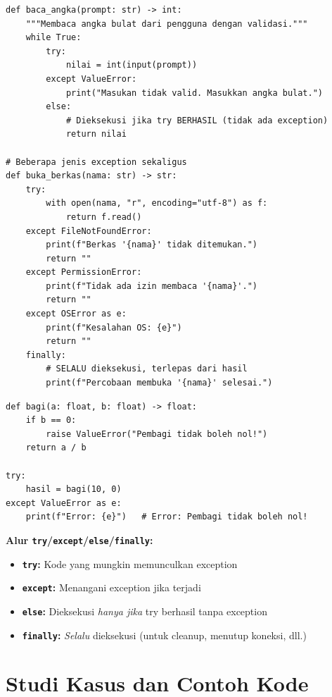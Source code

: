 \documentclass[../main.tex]{subfiles}
\begin{document}
\begin{lstlisting}[caption=Pola try/except/else/finally lengkap]
def baca_angka(prompt: str) -> int:
    """Membaca angka bulat dari pengguna dengan validasi."""
    while True:
        try:
            nilai = int(input(prompt))
        except ValueError:
            print("Masukan tidak valid. Masukkan angka bulat.")
        else:
            # Dieksekusi jika try BERHASIL (tidak ada exception)
            return nilai

# Beberapa jenis exception sekaligus
def buka_berkas(nama: str) -> str:
    try:
        with open(nama, "r", encoding="utf-8") as f:
            return f.read()
    except FileNotFoundError:
        print(f"Berkas '{nama}' tidak ditemukan.")
        return ""
    except PermissionError:
        print(f"Tidak ada izin membaca '{nama}'.")
        return ""
    except OSError as e:
        print(f"Kesalahan OS: {e}")
        return ""
    finally:
        # SELALU dieksekusi, terlepas dari hasil
        print(f"Percobaan membuka '{nama}' selesai.")
\end{lstlisting}

\begin{lstlisting}[caption=Raise exception dan exception kustom]
def bagi(a: float, b: float) -> float:
    if b == 0:
        raise ValueError("Pembagi tidak boleh nol!")
    return a / b

try:
    hasil = bagi(10, 0)
except ValueError as e:
    print(f"Error: {e}")   # Error: Pembagi tidak boleh nol!
\end{lstlisting}

\begin{konsep}
\textbf{Alur \texttt{try}/\texttt{except}/\texttt{else}/\texttt{finally}:}
\begin{itemize}[leftmargin=*]
  \item \textbf{\texttt{try}:} Kode yang mungkin memunculkan exception
  \item \textbf{\texttt{except}:} Menangani exception jika terjadi
  \item \textbf{\texttt{else}:} Dieksekusi \textit{hanya jika} try berhasil tanpa exception
  \item \textbf{\texttt{finally}:} \textit{Selalu} dieksekusi (untuk cleanup, menutup koneksi, dll.)
\end{itemize}
\end{konsep}

\section{Studi Kasus dan Contoh Kode}
\end{document}
